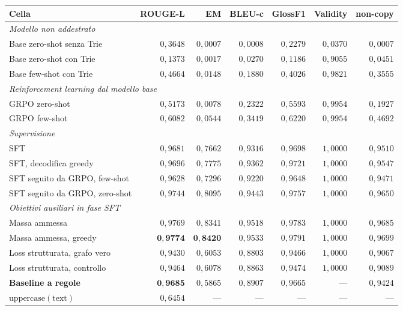 \begin{center}
\begin{tabular}{lrrrrrr}
\toprule
Cella & ROUGE-L & EM & BLEU-c & GlossF1 & Validity & non-copy \\
\midrule
\multicolumn{7}{l}{\emph{Modello non addestrato}} \\
Base zero-shot senza Trie & $0{,}3648$ & $0{,}0007$ & $0{,}0008$ & $0{,}2279$ & $0{,}0370$ & $0{,}0007$ \\
Base zero-shot con Trie & $0{,}1373$ & $0{,}0017$ & $0{,}0270$ & $0{,}1186$ & $0{,}9055$ & $0{,}0451$ \\
Base few-shot con Trie & $0{,}4664$ & $0{,}0148$ & $0{,}1880$ & $0{,}4026$ & $0{,}9821$ & $0{,}3555$ \\
\midrule
\multicolumn{7}{l}{\emph{Reinforcement learning dal modello base}} \\
GRPO zero-shot & $0{,}5173$ & $0{,}0078$ & $0{,}2322$ & $0{,}5593$ & $0{,}9954$ & $0{,}1927$ \\
GRPO few-shot & $0{,}6082$ & $0{,}0544$ & $0{,}3419$ & $0{,}6220$ & $0{,}9954$ & $0{,}4692$ \\
\midrule
\multicolumn{7}{l}{\emph{Supervisione}} \\
SFT & $0{,}9681$ & $0{,}7662$ & $0{,}9316$ & $0{,}9698$ & $1{,}0000$ & $0{,}9510$ \\
SFT, decodifica greedy & $0{,}9696$ & $0{,}7775$ & $0{,}9362$ & $0{,}9721$ & $1{,}0000$ & $0{,}9547$ \\
SFT seguito da GRPO, few-shot & $0{,}9628$ & $0{,}7296$ & $0{,}9220$ & $0{,}9648$ & $1{,}0000$ & $0{,}9471$ \\
SFT seguito da GRPO, zero-shot & $0{,}9744$ & $0{,}8095$ & $0{,}9443$ & $0{,}9757$ & $1{,}0000$ & $0{,}9650$ \\
\midrule
\multicolumn{7}{l}{\emph{Obiettivi ausiliari in fase SFT}} \\
Massa ammessa & $0{,}9769$ & $0{,}8341$ & $0{,}9518$ & $0{,}9783$ & $1{,}0000$ & $0{,}9685$ \\
Massa ammessa, greedy & $\mathbf{0{,}9774}$ & $\mathbf{0{,}8420}$ & $0{,}9533$ & $0{,}9791$ & $1{,}0000$ & $0{,}9699$ \\
Loss strutturata, grafo vero & $0{,}9430$ & $0{,}6053$ & $0{,}8803$ & $0{,}9466$ & $1{,}0000$ & $0{,}9067$ \\
Loss strutturata, controllo & $0{,}9464$ & $0{,}6078$ & $0{,}8863$ & $0{,}9474$ & $1{,}0000$ & $0{,}9089$ \\
\midrule
\textbf{Baseline a regole} & $\mathbf{0{,}9685}$ & $0{,}5865$ & $0{,}8907$ & $0{,}9665$ & --- & $0{,}9424$ \\
$\mathrm{uppercase}(\text{text})$ & $0{,}6454$ & --- & --- & --- & --- & --- \\
\bottomrule
\end{tabular}
\end{center}

